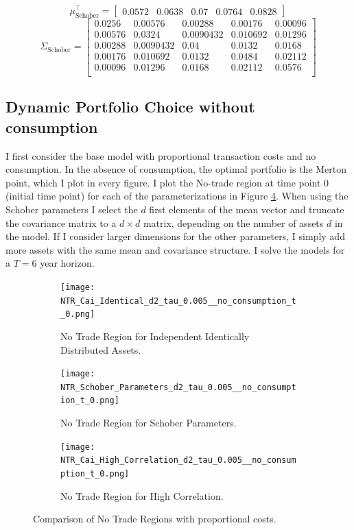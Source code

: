 \documentclass[11pt]{article}
\begin{document}
\[
\mu_{\text{Schober}}^\top = 
\begin{bmatrix}
0.0572 & 0.0638 & 0.07 & 0.0764 & 0.0828
\end{bmatrix}
\]
\[
\Sigma_{\text{Schober}} = 
\begin{bmatrix}
0.0256 & 0.00576 & 0.00288 & 0.00176 & 0.00096 \\
0.00576 & 0.0324 & 0.0090432 & 0.010692 & 0.01296 \\
0.00288 & 0.0090432 & 0.04 & 0.0132 & 0.0168 \\
0.00176 & 0.010692 & 0.0132 & 0.0484 & 0.02112 \\
0.00096 & 0.01296 & 0.0168 & 0.02112 & 0.0576 \\
\end{bmatrix}
\]
\subsection{Dynamic Portfolio Choice without consumption} \label{Subsection: Results_NoConsumption}
I first consider the base model with proportional transaction costs
and no consumption. In the absence of consumption, the optimal portfolio is the Merton point, which I plot in every figure.
I plot the No-trade region at time point 0 (initial time point) for each of the parameterizations in Figure \ref{fig:comparison_NTR}.
When using the Schober parameters I select the $d$ first elements of the mean vector and truncate the covariance matrix to a $d \times d$ matrix,
depending on the number of assets $d$ in the model. If I consider larger dimensions for the other parameters, I simply add more assets with the same mean and covariance structure.
I solve the models for a $T=6$ year horizon.
\begin{figure}[!ht]
    \centering
    \begin{subfigure}[t]{\textwidth}
        \centering
        \texttt{[image: NTR\_Cai\_Identical\_d2\_tau\_0.005\_\_no\_consumption\_t\_0.png]}
        \caption{No Trade Region for Independent Identically Distributed Assets.}
        \label{fig:NTR_2d_iid}
    \end{subfigure}

    \vspace{1em}

    \begin{subfigure}[t]{0.48\textwidth}
        \centering
        \texttt{[image: NTR\_Schober\_Parameters\_d2\_tau\_0.005\_\_no\_consumption\_t\_0.png]}
        \caption{No Trade Region for Schober Parameters.}
        \label{fig:NTR_2d_Schober}
    \end{subfigure}%
    \hfill
    \begin{subfigure}[t]{0.48\textwidth}
        \centering
        \texttt{[image: NTR\_Cai\_High\_Correlation\_d2\_tau\_0.005\_\_no\_consumption\_t\_0.png]}
        \caption{No Trade Region for High Correlation.}
        \label{fig:NTR_2d_High_Correlation}
    \end{subfigure}

    \caption{Comparison of No Trade Regions with proportional costs.}
    \label{fig:comparison_NTR}
\end{figure}
\end{document}
